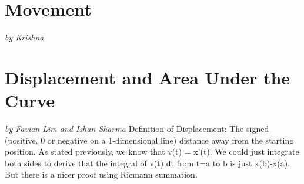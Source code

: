 \documentclass[a4paper,12pt,oneside]{book}
\begin{document}

\newpage
\chapter{Movement}
\vspace{-30pt}
\large \textit{by Krishna}


\newpage
\chapter{Displacement and Area Under the Curve}
\vspace{-30pt}
\large \textit{by Favian Lim and Ishan Sharma}
\newline \newline Definition of Displacement: The signed (positive, 0 or negative on a 1-dimensional line) distance away from the starting position.
\newline As stated previously, we know that v(t) = x'(t).
We could just integrate both sides to derive that the integral of v(t) dt from t=a to b is just x(b)-x(a).
\newline
\newline But there is a nicer proof using Riemann summation.
\end{document}
